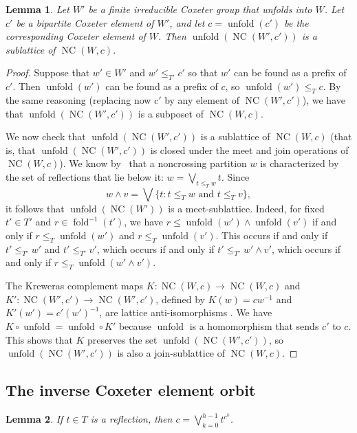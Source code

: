 \documentclass[10pt,a4paper]{amsart}
\newtheorem{lemma}[lemma]{Lemma}
\newcommand{\U}{{W'}}
\newcommand{\uu}{{w'}}
\DeclareMathOperator{\NC}{NC}
\DeclareMathOperator{\fold}{fold}
\DeclareMathOperator{\unfold}{unfold}
\begin{document}
\begin{lemma}
Let $\U$ be a finite irreducible Coxeter group that unfolds into $W$. Let $c'$ be a bipartite Coxeter element of $\U$, and let $c=\unfold(c')$ be the corresponding Coxeter element of $W$. Then $\unfold(\NC(\U,c'))$ is a sublattice of $\NC(W,c)$.
\label{lem:lattice_embedding}
\end{lemma}
\begin{proof}
Suppose that $w'\in W'$ and $w' \leq_{T'} c'$ so that $\uu$ can be found as a prefix of $c'$. Then $\unfold(\uu)$ can be found as a prefix of $c$, so $\unfold(\uu) \leq_T c$.  By the same reasoning (replacing now $c'$ by any element of $\NC(\U,c')$), we have that $\unfold(\NC(\U,c'))$ is a subposet of $\NC(W,c)$.

We now check that $\unfold(\NC(\U,c'))$ is a sublattice of $\NC(W,c)$ (that is, that $\unfold(\NC(\U,c'))$ is closed under the meet and join operations of $\NC(W,c)$).  We know by~\cite{brady2008non} that a noncrossing partition $w$ is characterized by the set of reflections that lie below it: $w = \bigvee_{t \leq_T w} t$. Since 
\[
w \wedge v = \bigvee\{t : t \leq_T w \text{ and } t \leq_T v\},
\]
 it follows that $\unfold(\NC(\U))$ is a meet-sublattice. Indeed, for fixed $t'\in T'$ and $r \in \fold^{-1}(t')$, we have $r \leq \unfold(w') \wedge \unfold(v')$ if and only if $r \leq_T \unfold(w')$ and $r \leq_T \unfold(v')$. This occurs if and only if $t' \leq_{T'} w'$ and $t' \leq_{T'} v'$, which occurs if and only if $t' \leq_{T'} w' \wedge v'$, which occurs if and only if $r \leq_T \unfold(w' \wedge v')$. 


The Kreweras complement maps $K:\NC(W,c)\to \NC(W,c)$ and $K':\NC(W',c')\to \NC(W',c')$, defined by $K(w)= cw^{-1}$ and $K'(w')=c'(w')^{-1}$, are lattice anti-isomorphisms \cite{armstrong2009generalized}. We have $K\circ\unfold=\unfold\circ K'$ because $\unfold$ is a homomorphism that sends $c'$ to $c$. This shows that $K$ preserves the set $\unfold(\NC(\U,c'))$, so $\unfold(\NC(\U,c'))$ is also a join-sublattice of $\NC(W,c)$.
\end{proof}

\setcounter{subsection}{3}
\subsection{The inverse Coxeter element orbit}
\label{sec:inverse_c_orbit}

\setcounter{theorem}{11}
\begin{lemma}\label{Lem:joinofcorbit}
If $t\in T$ is a reflection, then $c=\bigvee\limits_{k=0}^{h-1} t^{c^{k}}$.
\end{lemma}
\end{document}
